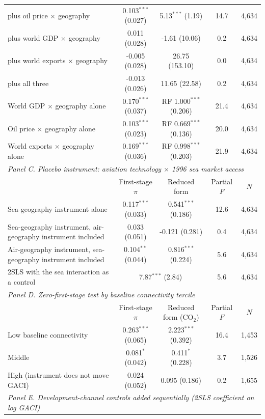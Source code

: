 \begin{table}[htbp]
\begin{threeparttable}
\begin{tabular}{lcccc}
  \quad plus oil price $\times$ geography & 0.103$^{***}$ (0.027) & 5.13$^{***}$ (1.19) & 14.7 & 4,634 \\
  \quad plus world GDP $\times$ geography & 0.011 (0.028) & -1.61 (10.06) & 0.2 & 4,634 \\
  \quad plus world exports $\times$ geography & -0.005 (0.028) & 26.75 (153.10) & 0.0 & 4,634 \\
  \quad plus all three & -0.013 (0.026) & 11.65 (22.58) & 0.2 & 4,634 \\
  World GDP $\times$ geography alone & 0.170$^{***}$ (0.037) & RF 1.000$^{***}$ (0.206) & 21.4 & 4,634 \\
  Oil price $\times$ geography alone & 0.103$^{***}$ (0.023) & RF 0.669$^{***}$ (0.136) & 20.0 & 4,634 \\
  World exports $\times$ geography alone & 0.169$^{***}$ (0.036) & RF 0.998$^{***}$ (0.203) & 21.9 & 4,634 \\
\midrule
\multicolumn{5}{l}{\textit{Panel C. Placebo instrument: aviation technology $\times$ 1996 sea market access}} \\
 & First-stage $\pi$ & Reduced form & Partial $F$ & $N$ \\
  Sea-geography instrument alone & 0.117$^{***}$ (0.033) & 0.541$^{***}$ (0.186) & 12.6 & 4,634 \\
  Sea-geography instrument, air-geography instrument included & 0.033 (0.051) & -0.121 (0.281) & 0.4 & 4,634 \\
  Air-geography instrument, sea-geography instrument included & 0.104$^{**}$ (0.044) & 0.816$^{***}$ (0.224) & 5.6 & 4,634 \\
  \quad 2SLS with the sea interaction as a control & \multicolumn{2}{c}{7.87$^{***}$ (2.84)} & 5.6 & 4,634 \\
\midrule
\multicolumn{5}{l}{\textit{Panel D. Zero-first-stage test by baseline connectivity tercile}} \\
 & First-stage $\pi$ & Reduced form (CO$_2$) & Partial $F$ & $N$ \\
  Low baseline connectivity & 0.263$^{***}$ (0.065) & 2.223$^{***}$ (0.392) & 16.4 & 1,453 \\
  Middle & 0.081$^{*}$ (0.042) & 0.411$^{*}$ (0.228) & 3.7 & 1,526 \\
  High (instrument does not move GACI) & 0.024 (0.052) & 0.095 (0.186) & 0.2 & 1,655 \\
\midrule
\multicolumn{5}{l}{\textit{Panel E. Development-channel controls added sequentially (2SLS coefficient on log GACI)}} \\

\end{tabular}
\end{threeparttable}
\end{table}
